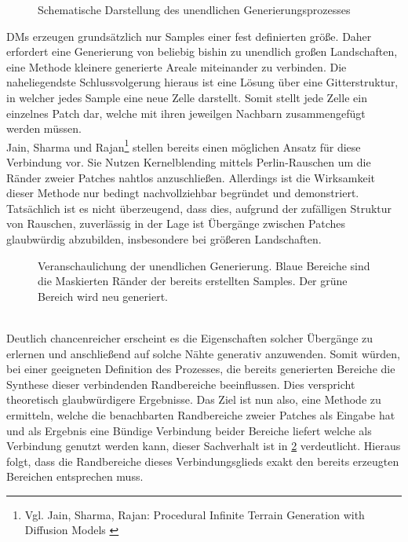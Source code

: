 \begin{figure}[htbp]
    \centering
    \caption{Schematische Darstellung des unendlichen Generierungsprozesses}
    \label{fig:inf_method}
\end{figure}
\ac{DM}s erzeugen grundsätzlich nur Samples einer fest definierten größe. Daher erfordert eine Generierung von beliebig bishin zu unendlich großen Landschaften, eine Methode kleinere generierte Areale miteinander zu verbinden. Die naheliegendste Schlussvolgerung hieraus ist eine Lösung über eine Gitterstruktur, in welcher jedes Sample eine neue Zelle darstellt. Somit stellt jede Zelle ein einzelnes Patch dar, welche mit ihren jeweilgen Nachbarn zusammengefügt werden müssen. \\
Jain, Sharma und Rajan\footnote{
    Vgl. Jain, Sharma, Rajan: Procedural Infinite Terrain Generation with Diffusion Models
    \cite{jain2022adaptive}
} stellen bereits einen möglichen Ansatz für diese Verbindung vor. Sie Nutzen Kernelblending mittels Perlin-Rauschen um die Ränder zweier Patches nahtlos anzuschließen. Allerdings ist die Wirksamkeit dieser Methode nur bedingt nachvollziehbar begründet und demonstriert. Tatsächlich ist es nicht überzeugend, dass dies, aufgrund der zufälligen Struktur von Rauschen, zuverlässig in der Lage ist Übergänge zwischen Patches glaubwürdig abzubilden, insbesondere bei größeren Landschaften.
\begin{figure}[htbp]
    \centering
    \caption{Veranschaulichung der unendlichen Generierung. Blaue Bereiche sind die Maskierten Ränder der bereits erstellten Samples. Der grüne Bereich wird neu generiert.}
    \label{fig:inf_naive}
\end{figure} \\
Deutlich chancenreicher erscheint es die Eigenschaften solcher Übergänge zu erlernen und anschließend auf solche Nähte generativ anzuwenden. Somit würden, bei einer geeigneten Definition des Prozesses, die bereits generierten Bereiche die Synthese dieser verbindenden Randbereiche beeinflussen. Dies verspricht theoretisch glaubwürdigere Ergebnisse. Das Ziel ist nun also, eine Methode zu ermitteln, welche die benachbarten Randbereiche zweier Patches als Eingabe hat und als Ergebnis eine Bündige Verbindung beider Bereiche liefert welche als Verbindung genutzt werden kann, dieser Sachverhalt ist in \ref{fig:inf_naive} verdeutlicht. Hieraus folgt, dass die Randbereiche dieses Verbindungsglieds exakt den bereits erzeugten Bereichen entsprechen muss. \\
